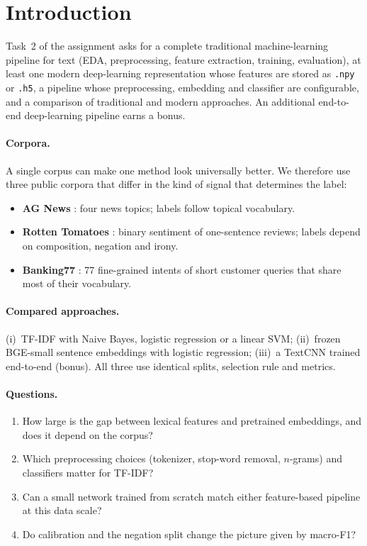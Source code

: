 \section{Introduction}
\label{sec:intro}

Task~2 of the assignment asks for a complete traditional machine-learning pipeline for text (EDA, preprocessing, feature extraction, training, evaluation), at least one modern deep-learning representation whose features are stored as \texttt{.npy} or \texttt{.h5}, a pipeline whose preprocessing, embedding and classifier are configurable, and a comparison of traditional and modern approaches. An additional end-to-end deep-learning pipeline earns a bonus.

\paragraph{Corpora.} A single corpus can make one method look universally better. We therefore use three public corpora that differ in the kind of signal that determines the label:
\begin{itemize}
  \item \textbf{AG News} \cite{zhang2015}: four news topics; labels follow topical vocabulary.
  \item \textbf{Rotten Tomatoes} \cite{pang2005}: binary sentiment of one-sentence reviews; labels depend on composition, negation and irony.
  \item \textbf{Banking77} \cite{casanueva2020}: 77 fine-grained intents of short customer queries that share most of their vocabulary.
\end{itemize}

\paragraph{Compared approaches.} (i)~TF-IDF with Naive Bayes, logistic regression or a linear SVM; (ii)~frozen BGE-small sentence embeddings with logistic regression; (iii)~a TextCNN trained end-to-end (bonus). All three use identical splits, selection rule and metrics.

\paragraph{Questions.}
\begin{enumerate}\renewcommand{\labelenumi}{\textbf{Q\arabic{enumi}.}}
  \item How large is the gap between lexical features and pretrained embeddings, and does it depend on the corpus?
  \item Which preprocessing choices (tokenizer, stop-word removal, $n$-grams) and classifiers matter for TF-IDF?
  \item Can a small network trained from scratch match either feature-based pipeline at this data scale?
  \item Do calibration and the negation split change the picture given by macro-F1?
\end{enumerate}

